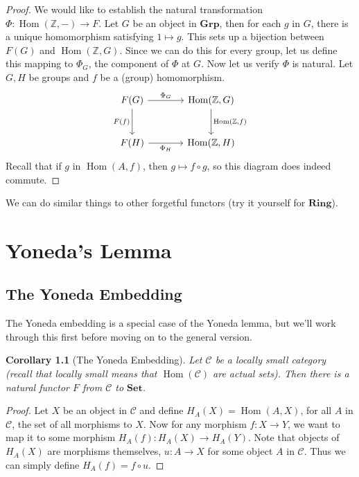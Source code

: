 \documentclass[12pt]{book}
\theoremstyle{definition}
\theoremstyle{plain}
\newtheorem{corollary}{Corollary}[definition]
\theoremstyle{definition}
\newcommand{\Z}{\mathbb{Z}}
\DeclareMathOperator{\Hom}{Hom}
\begin{document}
\begin{proof}
  We would like to establish the natural transformation $\Phi: \Hom(\Z, -) \rightarrow F$. Let $G$ be an object in $\mathbf{Grp}$, then for each $g$ in $G$, there is a unique homomorphism satisfying $1 \mapsto g$. This sets up a bijection between $F(G)$ and $\Hom(\Z, G)$. Since we can do this for every group, let us define this mapping to $\Phi_G$, the component of $\Phi$ at $G$. Now let us verify $\Phi$ is natural. Let $G, H$ be groups and $f$ be a (group) homomorphism.
  \[\begin{tikzcd}[row sep=large, column sep = large]
    F(G) \arrow{r}{\Phi_G} \arrow[swap]{d}{F(f)} & \Hom(\Z, G) \arrow{d}{\Hom(\Z, f)} \\
    F(H) \arrow[swap]{r}{\Phi_H} & \Hom(\Z, H)
  \end{tikzcd}\]
  Recall that if $g$ in $\Hom(A,f)$, then $g \mapsto f \circ g$, so this diagram does indeed commute.
\end{proof}
We can do similar things to other forgetful functors (try it yourself for $\mathbf{Ring}$).

\chapter{Yoneda's Lemma}

\section{The Yoneda Embedding}
The Yoneda embedding is a special case of the Yoneda lemma, but we'll work through this first before moving on to the general version.
\begin{corollary}[The Yoneda Embedding] Let $\mathscr{C}$ be a locally small category (recall that locally small means that $\Hom(\mathscr{C})$ are actual sets). Then there is a natural functor $F$ from $\mathscr{C}$ to $\mathbf{Set}$.
\end{corollary}

\begin{proof}
Let $X$ be an object in $\mathscr{C}$ and define $H_A(X) = \Hom(A, X)$, for all $A$ in $\mathscr{C}$, the set of all morphisms to $X$. Now for any morphism $f : X \rightarrow Y$,  we want to map it to some morphism $H_A(f) : H_A(X) \rightarrow H_A(Y)$. Note that objects of $H_A(X)$ are morphisms themselves, $u : A \rightarrow X$ for some object $A$ in $\mathscr{C}$. Thus we can simply define $H_A(f) = f \circ u$.
\end{proof}
\end{document}
